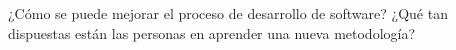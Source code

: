 ¿Cómo se puede mejorar el proceso de desarrollo de software?
¿Qué tan dispuestas están las personas en aprender una nueva metodología?